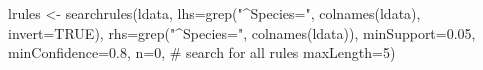 \begin{Schunk}
% --begin: "casestudy-assoc-searchrules"
\begin{Sinput}
lrules <- searchrules(ldata,
                      lhs=grep("^Species=", colnames(ldata), invert=TRUE),
                      rhs=grep("^Species=", colnames(ldata)),
                      minSupport=0.05,
                      minConfidence=0.8,
                      n=0,                         # search for all rules
                      maxLength=5)
\end{Sinput}
%
% --end: "casestudy-assoc-searchrules"
\end{Schunk}
